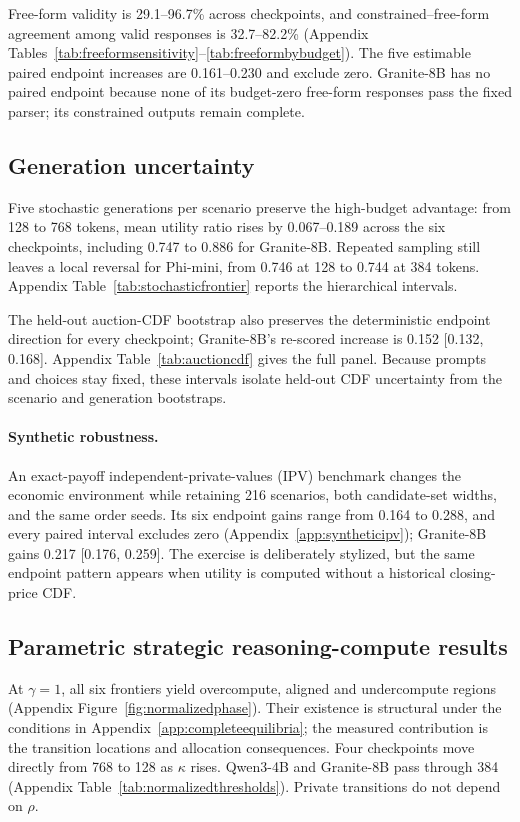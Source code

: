 \documentclass{article}
\begin{document}
Free-form validity is 29.1--96.7\% across checkpoints, and constrained--free-form agreement among valid responses is 32.7--82.2\% (Appendix Tables~\ref{tab:freeformsensitivity}--\ref{tab:freeformbybudget}). The five estimable paired endpoint increases are 0.161--0.230 and exclude zero. Granite-8B has no paired endpoint because none of its budget-zero free-form responses pass the fixed parser; its constrained outputs remain complete.

\subsection{Generation uncertainty}

Five stochastic generations per scenario preserve the high-budget advantage: from 128 to 768 tokens, mean utility ratio rises by 0.067--0.189 across the six checkpoints, including 0.747 to 0.886 for Granite-8B. Repeated sampling still leaves a local reversal for Phi-mini, from 0.746 at 128 to 0.744 at 384 tokens. Appendix Table~\ref{tab:stochasticfrontier} reports the hierarchical intervals.

The held-out auction-CDF bootstrap also preserves the deterministic endpoint direction for every checkpoint; Granite-8B's re-scored increase is 0.152 [0.132, 0.168]. Appendix Table~\ref{tab:auctioncdf} gives the full panel. Because prompts and choices stay fixed, these intervals isolate held-out CDF uncertainty from the scenario and generation bootstraps.

\paragraph{Synthetic robustness.}
An exact-payoff independent-private-values (IPV) benchmark changes the economic environment while retaining 216 scenarios, both candidate-set widths, and the same order seeds. Its six endpoint gains range from 0.164 to 0.288, and every paired interval excludes zero (Appendix~\ref{app:syntheticipv}); Granite-8B gains 0.217 [0.176, 0.259]. The exercise is deliberately stylized, but the same endpoint pattern appears when utility is computed without a historical closing-price CDF.

\subsection{Parametric strategic reasoning-compute results}
\label{sec:strategicresults}

At $\gamma=1$, all six frontiers yield overcompute, aligned and undercompute regions (Appendix Figure~\ref{fig:normalizedphase}). Their existence is structural under the conditions in Appendix~\ref{app:completeequilibria}; the measured contribution is the transition locations and allocation consequences. Four checkpoints move directly from 768 to 128 as $\kappa$ rises. Qwen3-4B and Granite-8B pass through 384 (Appendix Table~\ref{tab:normalizedthresholds}). Private transitions do not depend on $\rho$.
\end{document}
